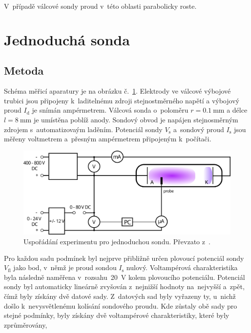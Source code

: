 \documentclass{protokol}
\newcommand\idisch{I_\mathrm{d}}
\newcommand\iprobe{I_\mathrm{s}}
\newcommand\flpot{V_\mathrm{fl}}
\newcommand\potprobe{V_\mathrm{s}}
\begin{document}
V~případě válcové sondy proud v~této oblasti parabolicky roste.

\section{Jednoduchá sonda}
\label{sec:simple}

\subsection{Metoda}
\label{sec:method-simple}
Schéma měřicí aparatury je na obrázku č.~\ref{fig:diagram-simple}.
Elektrody ve válcové výbojové trubici jsou připojeny k~laditelnému zdroji
stejnostměrného napětí a výbojový proud $\idisch$ je snímán ampérmetrem.
Válcová sonda o~poloměru $r=\SI{0.1}{\milli\metre}$
a délce $l=\SI{8}{\milli\metre}$ je umístěna poblíž anody.
Sondový obvod je napájen stejnosměrným zdrojem s~automatizovaým laděním.
Potenciál sondy $\potprobe$ a~sondový proud $\iprobe$ jsou měřeny
voltmetrem a~přesným ampérmetrem připojeným k~počítači.

\begin{figure}[hbp]
	\centering
	\includegraphics{diagram-simple.png}
	\caption{Uspořádání experimentu pro jednoduchou sondu.
		Převzato z~\autocite{assignment-simpleprobe}.}
	\label{fig:diagram-simple}
\end{figure}

Pro každou sadu podmínek byl nejprve přibližně určen plovoucí potenciál sondy
$\flpot$ jako bod, v~němž je proud sondou $\iprobe$ nulový.
Voltampérová charakteristika byla následně naměřena v~rozsahu~\SI{20}{\volt}
kolem plovoucího potenciálu.
Potenciál sondy byl automaticky lineárně zvyšován z~nejnižší hodnoty
na~nejvyšší a~zpět, čímž byly získány dvě datové sady.
Z~datových sad byly vyřazeny ty, u~nichž došlo k~nevysvětlenému kolísání
sondového proudu.
Kde zůstaly obě sady pro stejné podmínky, byly získány dvě voltampérové
charakteristiky, které byly zprůměrovány,
\end{document}
